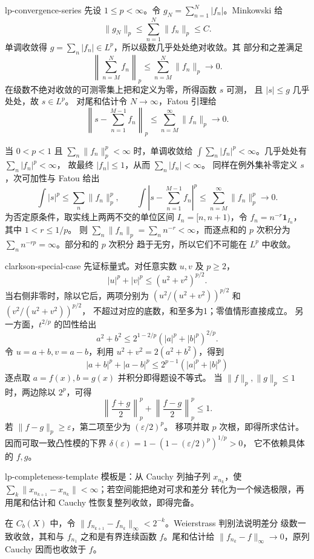 \begin{solution}{lp-convergence-series}
先设 \(1\le p<\infty\)。令 \(g_N=\sum_{n=1}^{N}|f_n|\)。Minkowski 给
\[
 \|g_N\|_p\le\sum_{n=1}^{N}\|f_n\|_p\le C.
\]
单调收敛得 \(g=\sum_n|f_n|\in L^p\)，所以级数几乎处处绝对收敛。其
部分和之差满足
\[
 \left\|\sum_{n=M}^{N}f_n\right\|_p
 \le\sum_{n=M}^{N}\|f_n\|_p\to0.
\]
在级数不绝对收敛的可测零集上把和定义为零，所得函数 \(s\) 可测，
且 \(|s|\le g\) 几乎处处，故 \(s\in L^p\)。
对尾和估计令 \(N\to\infty\)，Fatou 引理给
\[
 \left\|s-\sum_{n=1}^{M-1}f_n\right\|_p
 \le\sum_{n=M}^{\infty}\|f_n\|_p\longrightarrow0.
\]

当 \(0<p<1\) 且 \(\sum_n\|f_n\|_p^p<\infty\) 时，单调收敛给
\(\int\sum_n|f_n|^p<\infty\)。几乎处处有 \(\sum_n|f_n|^p<\infty\)，
故最终 \(|f_n|\le1\)，从而 \(\sum_n|f_n|<\infty\)。
同样在例外集补零定义 \(s\)，次可加性与 Fatou 给出
\[
 \int|s|^p\le\sum_n\|f_n\|_p^p,\qquad
 \int\left|s-\sum_{n=1}^{M-1}f_n\right|^p
 \le\sum_{n=M}^{\infty}\|f_n\|_p^p\longrightarrow0.
\]
为否定原条件，取实线上两两不交的单位区间 \(I_n=[n,n+1)\)，令
\(f_n=n^{-r}\mathbf1_{I_n}\)，其中 \(1<r\le1/p\)。
则 \(\sum_n\|f_n\|_p=\sum_nn^{-r}<\infty\)，而逐点和的
\(p\) 次积分为 \(\sum_nn^{-rp}=\infty\)。部分和的 \(p\) 次积分
趋于无穷，所以它们不可能在 \(L^p\) 中收敛。
\end{solution}

\begin{solution}{clarkson-special-case}
先证标量式。对任意实数 \(u,v\) 及 \(p\ge2\)，
\[
 |u|^p+|v|^p\le(u^2+v^2)^{p/2}.
\]
当右侧非零时，除以它后，两项分别为
\((u^2/(u^2+v^2))^{p/2}\) 和 \((v^2/(u^2+v^2))^{p/2}\)，
不超过对应的底数，和至多为1；零值情形直接成立。
另一方面，\(t^{2/p}\) 的凹性给出
\[
 a^2+b^2\le2^{1-2/p}(|a|^p+|b|^p)^{2/p}.
\]
令 \(u=a+b,v=a-b\)，利用 \(u^2+v^2=2(a^2+b^2)\)，得到
\[
 |a+b|^p+|a-b|^p\le2^{p-1}(|a|^p+|b|^p)
\]
逐点取 \(a=f(x),b=g(x)\) 并积分即得题设不等式。
当 \(\|f\|_p,\|g\|_p\le1\) 时，两边除以 \(2^p\)，可得
\[
 \left\|\frac{f+g}{2}\right\|_p^p+
 \left\|\frac{f-g}{2}\right\|_p^p\le1.
\]
若 \(\|f-g\|_p\ge\varepsilon\)，第二项至少为 \((\varepsilon/2)^p\)。
移项并取 \(p\) 次根，即得所求估计。因而可取一致凸性模的下界
\(\delta(\varepsilon)=1-(1-(\varepsilon/2)^p)^{1/p}>0\)，
它不依赖具体的 \(f,g\)。
\end{solution}

\begin{solution}{lp-completeness-template}
模板是：从 Cauchy 列抽子列 \(x_{n_k}\)，使
\(\sum_k\|x_{n_{k+1}}-x_{n_k}\|<\infty\)；若空间能把绝对可求和差分
转化为一个候选极限，再用尾和估计和 Cauchy 性恢复整列收敛，即得完备。

在 \(C_b(X)\) 中，令
\(\|f_{n_{k+1}}-f_{n_k}\|_\infty<2^{-k}\)。Weierstrass 判别法说明差分
级数一致收敛，其和与 \(f_{n_1}\) 之和是有界连续函数 \(f\)。尾和估计给
\(\|f_{n_k}-f\|_\infty\to0\)，原列 Cauchy 因而也收敛于 \(f\)。
\end{solution}
